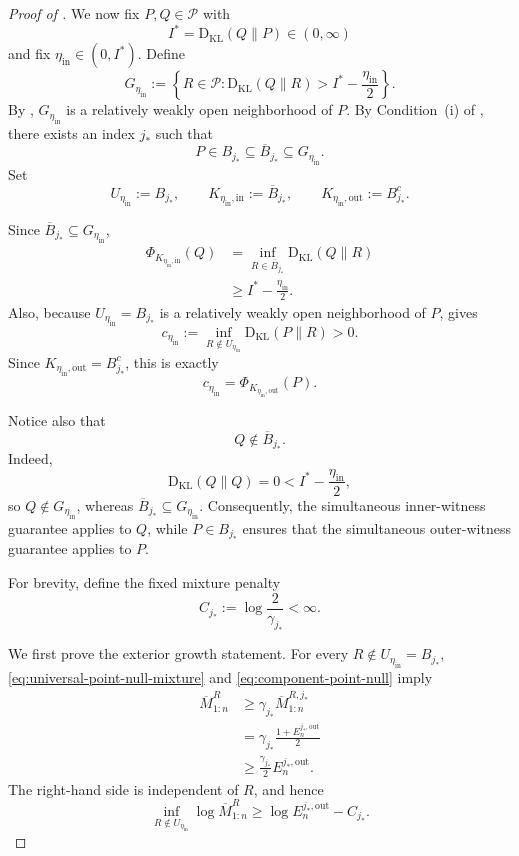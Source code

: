 \documentclass[12pt]{article}
\theoremstyle{spaced}
\theoremstyle{remark}
\newcommand{\calP}{\mathcal P}
\newcommand{\KL}{\mathrm{D}_{\text{KL}}}
\begin{document}
\begin{proof}[Proof of ]
We now fix $P,Q\in\calP$ with
\[
    I^*=\KL(Q\|P)\in(0,\infty)
\]
and fix $\eta_{\mathrm{in}}\in(0,I^*)$. Define
\[
    G_{\eta_{\mathrm{in}}}
    :=
    \left\{
        R\in\calP:
        \KL(Q\|R)>
        I^*-\frac{\eta_{\mathrm{in}}}{2}
    \right\}.
\]
By ,
$G_{\eta_{\mathrm{in}}}$ is a relatively weakly open
neighborhood of $P$. By Condition~\textup{(i)} of
, there exists an index $j_*$ such that
\[
    P\in B_{j_*}
    \subseteq
    \overline B_{j_*}
    \subseteq
    G_{\eta_{\mathrm{in}}}.
\]
Set
\[
    U_{\eta_{\mathrm{in}}}:=B_{j_*},
    \qquad
    K_{\eta_{\mathrm{in}},\mathrm{in}}
    :=
    \overline B_{j_*},
    \qquad
    K_{\eta_{\mathrm{in}},\mathrm{out}}
    :=
    B_{j_*}^c.
\]

Since
$\overline B_{j_*}\subseteq G_{\eta_{\mathrm{in}}}$,
\[
\begin{aligned}
    \Phi_{K_{\eta_{\mathrm{in}},\mathrm{in}}}(Q)
    &=
    \inf_{R\in\overline B_{j_*}}
    \KL(Q\|R)\\
    &\ge
    I^*-\frac{\eta_{\mathrm{in}}}{2}.
\end{aligned}
\]
Also, because $U_{\eta_{\mathrm{in}}}=B_{j_*}$ is a relatively
weakly open neighborhood of $P$,
 gives
\[
    c_{\eta_{\mathrm{in}}}
    :=
    \inf_{R\notin U_{\eta_{\mathrm{in}}}}
    \KL(P\|R)
    >0.
\]
Since
$K_{\eta_{\mathrm{in}},\mathrm{out}}
=B_{j_*}^c$, this is exactly
\[
    c_{\eta_{\mathrm{in}}}
    =
    \Phi_{K_{\eta_{\mathrm{in}},\mathrm{out}}}(P).
\]

Notice also that
\[
    Q\notin\overline B_{j_*}.
\]
Indeed,
\[
    \KL(Q\|Q)=0
    <
    I^*-\frac{\eta_{\mathrm{in}}}{2},
\]
so $Q\notin G_{\eta_{\mathrm{in}}}$, whereas
$\overline B_{j_*}\subseteq G_{\eta_{\mathrm{in}}}$.
Consequently, the simultaneous inner-witness guarantee applies
to $Q$, while $P\in B_{j_*}$ ensures that the simultaneous
outer-witness guarantee applies to $P$.

For brevity, define the fixed mixture penalty
\[
    C_{j_*}
    :=
    \log\frac{2}{\gamma_{j_*}}
    <\infty.
\]

We first prove the exterior growth statement. For every
$R\notin U_{\eta_{\mathrm{in}}}=B_{j_*}$,
\eqref{eq:universal-point-null-mixture} and
\eqref{eq:component-point-null} imply
\[
\begin{aligned}
    \overline M_{1:n}^{R}
    &\ge
    \gamma_{j_*}
    \overline M_{1:n}^{R,j_*}\\
    &=
    \gamma_{j_*}
    \frac{1+E_n^{j_*,\mathrm{out}}}{2}\\
    &\ge
    \frac{\gamma_{j_*}}{2}
    E_n^{j_*,\mathrm{out}}.
\end{aligned}
\]
The right-hand side is independent of $R$, and hence
\begin{equation}
\label{eq:universal-outer-lower}
    \inf_{R\notin U_{\eta_{\mathrm{in}}}}
    \log\overline M_{1:n}^{R}
    \ge
    \log E_n^{j_*,\mathrm{out}}
    -
    C_{j_*}.
\end{equation}


\end{proof}
\end{document}
